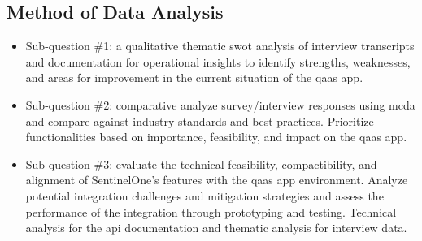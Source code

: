 \begin{multicols}{2}
      \subsection{Method of Data Analysis}
      \begin{itemize}[label=-]
            \item Sub-question \#1: a qualitative thematic \acrshort{swot} analysis of interview transcripts
                  and documentation for operational insights to identify strengths, weaknesses, and areas for
                  improvement in the current situation of the \acrshort{qaas} app.
            \item Sub-question \#2: comparative analyze survey/interview responses using \acrshort{mcda} and
                  compare against industry standards and best practices. Prioritize functionalities based on
                  importance, feasibility, and impact on the \acrshort{qaas} app.
            \item Sub-question \#3: evaluate the technical feasibility, compactibility, and alignment of
                  SentinelOne's features with the \acrshort{qaas} app environment. Analyze potential integration
                  challenges and mitigation strategies and assess the performance of the integration through
                  prototyping and testing. Technical analysis for the \acrshort{api} documentation and
                  thematic analysis for interview data.
      \end{itemize}

\end{multicols}
